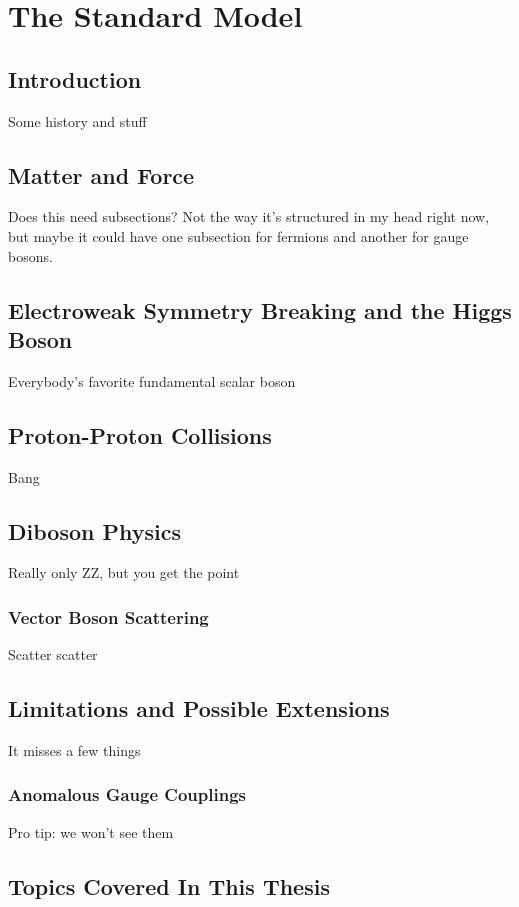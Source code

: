 
\chapter{The Standard Model}

\section{Introduction}
Some history and stuff



\section{Matter and Force}
Does this need subsections? Not the way it's structured in my head right now, but maybe it could have one subsection for fermions and another for gauge bosons.



\section{Electroweak Symmetry Breaking and the Higgs Boson}
Everybody's favorite fundamental scalar boson



\section{Proton-Proton Collisions}
\label{sec:pp}
Bang



\section{Diboson Physics}
Really only ZZ, but you get the point

\subsection{Vector Boson Scattering}
Scatter scatter


\section{Limitations and Possible Extensions}
It misses a few things

\subsection{Anomalous Gauge Couplings}
Pro tip: we won't see them



\section{Topics Covered In This Thesis}

